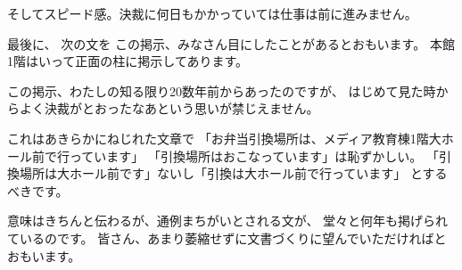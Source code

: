 \documentclass[uplatex,jis2004,dvipdfmx,12pt]{jsarticle}
\begin{document}
そしてスピード感。決裁に何日もかかっていては仕事は前に進みません。


最後に、
次の文を
この掲示、みなさん目にしたことがあるとおもいます。
本館1階はいって正面の柱に掲示してあります。

この掲示、わたしの知る限り20数年前からあったのですが、
はじめて見た時からよく決裁がとおったなあという思いが禁じえません。

これはあきらかにねじれた文章で
「お弁当引換場所は、メディア教育棟1階大ホール前で行っています」
「引換場所はおこなっています」は恥ずかしい。
「引換場所は大ホール前です」ないし「引換は大ホール前で行っています」
とするべきです。

意味はきちんと伝わるが、通例まちがいとされる文が、
堂々と何年も掲げられているのです。
皆さん、あまり萎縮せずに文書づくりに望んでいただければとおもいます。
\end{document}
